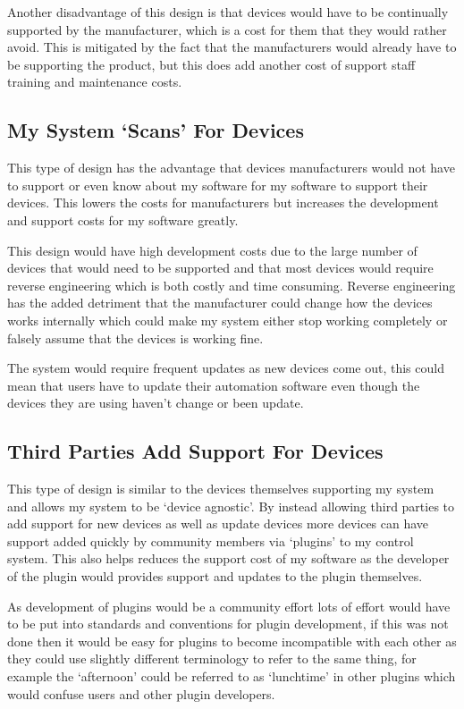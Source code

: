 Another disadvantage of this design is that devices would have to be continually
supported by the manufacturer, which is a cost for them that they would rather
avoid. This is mitigated by the fact that the manufacturers would already have
to be supporting the product, but this does add another cost of support staff
training and maintenance costs.

\subsection{My System `Scans' For Devices}
This type of design has the advantage that devices manufacturers would not have
to support or even know about my software for my software to support their
devices. This lowers the costs for manufacturers but increases the development
and support costs for my software greatly.

This design would have high development costs due to the large number of devices
that would need to be supported and that most devices would require reverse
engineering which is both costly and time consuming. Reverse engineering has the
added detriment that the manufacturer could change how the devices works
internally which could make my system either stop working completely or falsely
assume that the devices is working fine.

The system would require frequent updates as new devices come out, this could
mean that users have to update their automation software even though the devices
they are using haven't change or been update.

\subsection{Third Parties Add Support For Devices}
\label{section:third-party}
This type of design is similar to the devices themselves supporting my system
and allows my system to be `device agnostic'. By instead allowing third parties
to add support for new devices as well as update devices more devices can have
support added quickly by community members via `plugins' to my control system.
This also helps reduces the support cost of my software as the developer of the
plugin would provides support and updates to the plugin themselves.

As development of plugins would be a community effort lots of effort would have
to be put into standards and conventions for plugin development, if this was not
done then it would be easy for plugins to become incompatible with each other as
they could use slightly different terminology to refer to the same thing, for
example the `afternoon' could be referred to as `lunchtime' in other plugins
which would confuse users and other plugin developers.

